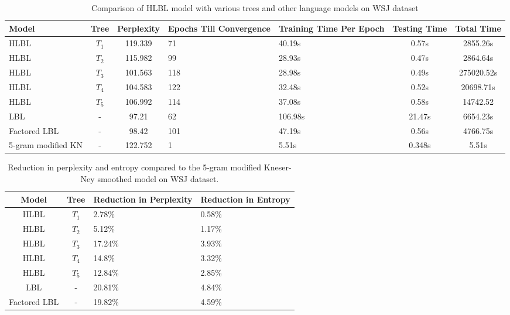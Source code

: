\begin{table*} \centering
{}
\begin{tabular}{@{}C{3cm}ccC{2cm}C{2cm}cc@{}}\toprule
Model & Tree & Perplexity & Epochs Till Convergence & Training Time Per Epoch & Testing Time & Total Time\\ 
\midrule
 HLBL & $T_1$ &119.339 & 71& 40.19s & 0.57s& 2855.26s\\
 HLBL & $T_2$ &115.982 & 99& 28.93s & 0.47s & 2864.64s\\
 HLBL & $T_3$ &101.563 & 118& 28.98s & 0.49s & 275020.52s \\
 HLBL & $T_4$ &104.583 & 122& 32.48s & 0.52s & 20698.71s\\
 HLBL & $T_5$ &106.992 & 114& 37.08s & 0.58s& 14742.52\\
 LBL& - &97.21 &62 &106.98s & 21.47s& 6654.23s\\
 Factored LBL & - &98.42&101 & 47.19s & 0.56s & 4766.75s \\
 5-gram modified KN & - &122.752& 1 & 5.51s & 0.348s & 5.51s\\
\bottomrule
\end{tabular}
\caption{Comparison of HLBL model with various trees and other language models on WSJ dataset}
\label{tab:languageModelComparison}
\end{table*}

\begin{table*} \centering
{}
\begin{tabular}{@{}ccC{2cm}C{2cm}@{}}\toprule
Model & Tree & Reduction in Perplexity & Reduction in Entropy \\
\midrule
 HLBL & $T_1$ &2.78\% & 0.58\%\\
 HLBL & $T_2$ &5.12\% & 1.17\% \\
 HLBL & $T_3$ &17.24\% & 3.93\%  \\
 HLBL & $T_4$ &14.8\% & 3.32\%\\
 HLBL & $T_5$ &12.84\% & 2.85\%\\
 LBL& - & 20.81\% &4.84\%\\
 Factored LBL & - &19.82\%&4.59\% \\
\bottomrule
\end{tabular}
\caption{Reduction in perplexity and entropy compared to the 5-gram modified Kneser-Ney smoothed model on WSJ dataset.}
\label{tab:reductionPerplexity}
\end{table*}

